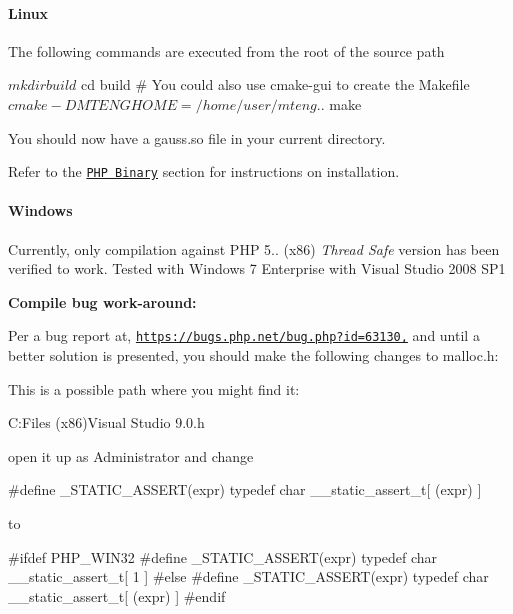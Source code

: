 \paragraph*{Linux}

The following commands are executed from the root of the source path \begin{DoxyVerb}$ mkdir build
$ cd build
# You could also use cmake-gui to create the Makefile
$ cmake -DMTENGHOME=/home/user/mteng ..
$ make
\end{DoxyVerb}


You should now have a {\ttfamily gauss.\-so} file in your current directory.

Refer to the \href{#php_install_binary}{\tt P\-H\-P Binary} section for instructions on installation.

\paragraph*{Windows}

Currently, only compilation against P\-H\-P 5.. (x86) {\itshape Thread Safe} version has been verified to work. Tested with Windows 7 Enterprise with Visual Studio 2008 S\-P1

{\bfseries Compile bug work-\/around\-:}

Per a bug report at, \href{https://bugs.php.net/bug.php?id=63130,}{\tt https\-://bugs.\-php.\-net/bug.\-php?id=63130,} and until a better solution is presented, you should make the following changes to {\ttfamily malloc.\-h}\-:

This is a possible path where you might find it\-: \begin{DoxyVerb}C:\Program Files (x86)\Microsoft Visual Studio 9.0\VC\malloc.h
\end{DoxyVerb}


open it up as Administrator and change


\begin{DoxyCode}
\textcolor{preprocessor}{#define \_STATIC\_ASSERT(expr) typedef char \_\_static\_assert\_t[ (expr) ]}
\end{DoxyCode}
 to 
\begin{DoxyCode}
\textcolor{preprocessor}{#ifdef PHP\_WIN32}
\textcolor{preprocessor}{}\textcolor{preprocessor}{#define \_STATIC\_ASSERT(expr) typedef char \_\_static\_assert\_t[ 1 ]}
\textcolor{preprocessor}{}\textcolor{preprocessor}{#else}
\textcolor{preprocessor}{}\textcolor{preprocessor}{#define \_STATIC\_ASSERT(expr) typedef char \_\_static\_assert\_t[ (expr) ]}
\textcolor{preprocessor}{#endif}
\end{DoxyCode}


